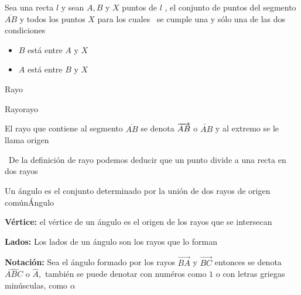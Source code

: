 \documentclass[12pt]{book}
\begin{document}
\begin{definicion}{Sea una recta $l$ y sean $A,B$ y $X$ puntos de $l$ , el conjunto de puntos
del segmento $\overline{AB}$ y todos los puntos $X$ para los cuales \ se
cumple una y s\'{o}lo una de las dos condiciones

\begin{itemize}
\item $B$ est\'{a} entre $A$ y $X$

\item $A$ est\'{a} entre $B$ y $X$
\end{itemize}}{Rayo}
\begin{figura}{
}{Rayo}{rayo}
 \end{figura}
El rayo que contiene al segmento $\overline{AB}$ se denota $\overrightarrow{%
AB}$ o $\overleftarrow{AB}$ y al extremo se le llama origen

\nota\, De la definici\'{o}n de rayo podemos deducir que un punto divide a
una recta en dos rayos
\end{definicion}
\begin{definicion}{Un \'{a}ngulo es el conjunto determinado por la unión de dos
rayos de origen
com\'{u}n}{Ángulo}
\begin{lista}
 \item \textbf{V\'{e}rtice:} el v\'{e}rtice de un \'{a}ngulo es el origen de los rayos
que se intersecan
\item \textbf{Lados:} Los lados de un \'{a}ngulo son los rayos que lo forman
\item \textbf{Notación:} Sea el \'{a}ngulo formado por los rayos $\overrightarrow{BA}$ y $%
 \overrightarrow{BC}$ entonces se denota $\widehat{ABC}$ o $\widehat{A},$
 tambi\'{e}n se puede denotar con num\'{e}ros como $1$ o con letras
 griegas min\'{u}sculas, como $\alpha $
\end{lista}
\end{definicion}
\end{document}
